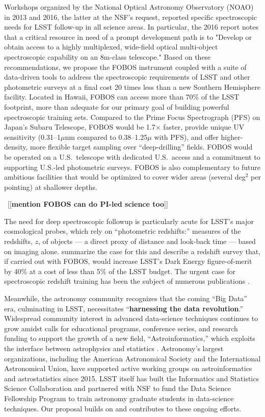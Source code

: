 \documentclass[oneside,11pt]{amsart}
\newcommand{\comment}[2][todo]{{\color{#1}[[{\bf #2}]]}}
\begin{document}
Workshops organized by the National Optical Astronomy Observatory (NOAO)
in 2013 and 2016, the latter at the NSF's request, reported specific
spectroscopic needs for LSST follow-up in all science areas.  In
particular, the 2016 report notes that a critical resource in need of a
prompt development path is to "Develop or obtain access to a highly
multiplexed, wide-field optical multi-object spectroscopic capability on
an 8m-class telescope."  Based on these recommendations, we propose the
FOBOS instrument coupled with a suite of data-driven tools to address
the spectroscopic requirements of LSST and other photometric surveys at
a final cost 20 times less than a new Southern Hemisphere facility.
Located in Hawaii, FOBOS can access more than 70\% of the LSST
footprint, more than adequate for our primary goal of building powerful
spectroscopic training sets.  Compared to the Prime Focus Spectrograph
(PFS) on Japan's Subaru Telescope, FOBOS would be 1.7$\times$ faster,
provide unique UV sensitivity (0.31--1$\mu$nm compared to
0.38--1.25$\mu$ with PFS), and offer higher-density, more flexible
target sampling over ``deep-drilling'' fields.  FOBOS would be operated
on a U.S.\ telescope with dedicated U.S.\ access and a commitment to
supporting U.S.-led photometric surveys.  FOBOS is also complementary to
future ambitious facilities that would be optimized to cover wider areas
(several deg$^2$ per pointing) at shallower depths.

~\comment{mention FOBOS can do PI-led science too}

The need for deep spectroscopic followup is particularly acute for
LSST's major cosmological probes, which rely on ``photometric
redshifts:'' measures of the redshifts, $z$, of objects --- a direct
proxy of distance and look-back time --- based on imaging alone.
\citet{newman15} summarize the case for this and describe a redshift
survey that, if carried out with FOBOS, would increase LSST's Dark
Energy figure-of-merit by 40\% at a cost of less than 5\% of the LSST
budget.  The urgent case for spectroscopic redshift training has been
the subject of numerous publications \citep[e.g.,][]{laureijs11,
masters15, hemmati18}.

Meanwhile, the astronomy community recognizes that the coming ``Big
Data'' era, culminating in LSST, necessitates ``\textbf{harnessing the
data revolution}.''  Widespread community interest in advanced
data-science techniques continues to grow amidst calls for educational
programs, conference series, and research funding to support the growth
of a new field, ``Astroinformatics,'' which exploits the interface
between astrophysics and statistics \citep{borne09}.  Astronomy's
largest organizations, including the American Astronomical Society and
the International Astronomical Union, have supported active working
groups on astroinformatics and astrostatistics since 2015.  LSST itself
has built the Informatics and Statistics Science Collaboration and
partnered with NSF to fund the Data Science Fellowship Program to train
astronomy graduate students in data-science techniques.  Our proposal
builds on and contributes to these ongoing efforts.
\end{document}
